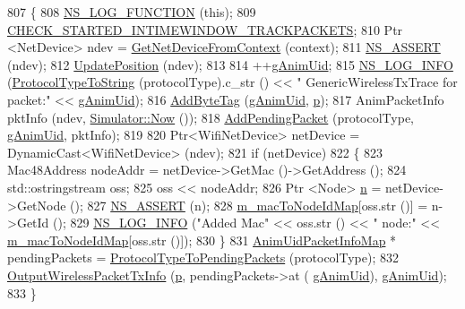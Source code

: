 \begin{DoxyCode}
807 \{
808   \hyperlink{log-macros-disabled_8h_a90b90d5bad1f39cb1b64923ea94c0761}{NS\_LOG\_FUNCTION} (\textcolor{keyword}{this});
809   \hyperlink{animation-interface_8h_acdf351a3155a6ccf1813189e10dba8f5}{CHECK\_STARTED\_INTIMEWINDOW\_TRACKPACKETS};
810   Ptr <NetDevice> ndev = \hyperlink{classns3_1_1AnimationInterface_a5054e94f0c5e3d0a4443cfbe52e2ea30}{GetNetDeviceFromContext} (context);
811   \hyperlink{assert_8h_a6dccdb0de9b252f60088ce281c49d052}{NS\_ASSERT} (ndev);
812   \hyperlink{classns3_1_1AnimationInterface_ab751cf6f459289f0978f4bb97b93044d}{UpdatePosition} (ndev);
813 
814   ++\hyperlink{classns3_1_1AnimationInterface_a98ecb4d4c024e52171b3154f09b7bcc2}{gAnimUid};
815   \hyperlink{group__logging_gafbd73ee2cf9f26b319f49086d8e860fb}{NS\_LOG\_INFO} (\hyperlink{classns3_1_1AnimationInterface_a1b901b34acadaa3c35433083d542dd19}{ProtocolTypeToString} (protocolType).c\_str () << \textcolor{stringliteral}{"
       GenericWirelessTxTrace for packet:"} << \hyperlink{classns3_1_1AnimationInterface_a98ecb4d4c024e52171b3154f09b7bcc2}{gAnimUid});
816   \hyperlink{classns3_1_1AnimationInterface_a7963c89df19cb9a145f16a369e83ec9c}{AddByteTag} (\hyperlink{classns3_1_1AnimationInterface_a98ecb4d4c024e52171b3154f09b7bcc2}{gAnimUid}, \hyperlink{lte__link__budget_8m_ac9de518908a968428863f829398a4e62}{p});
817   AnimPacketInfo pktInfo (ndev, \hyperlink{classns3_1_1Simulator_ac3178fa975b419f7875e7105be122800}{Simulator::Now} ());
818   \hyperlink{classns3_1_1AnimationInterface_ab7f3bc1843610f2d9514ddf5d756eaa5}{AddPendingPacket} (protocolType, \hyperlink{classns3_1_1AnimationInterface_a98ecb4d4c024e52171b3154f09b7bcc2}{gAnimUid}, pktInfo);
819 
820   Ptr<WifiNetDevice> netDevice = DynamicCast<WifiNetDevice> (ndev);
821   \textcolor{keywordflow}{if} (netDevice)
822     \{ 
823       Mac48Address nodeAddr = netDevice->GetMac ()->GetAddress ();
824       std::ostringstream oss; 
825       oss << nodeAddr;
826       Ptr <Node> \hyperlink{namespacesample-rng-plot_aeb5ee5c431e338ef39b7ac5431242e1d}{n} = netDevice->GetNode ();
827       \hyperlink{assert_8h_a6dccdb0de9b252f60088ce281c49d052}{NS\_ASSERT} (n);
828       \hyperlink{classns3_1_1AnimationInterface_a4d47d5b16cac7965cc0fbb1c50b3a268}{m\_macToNodeIdMap}[oss.str ()] = n->GetId ();
829       \hyperlink{group__logging_gafbd73ee2cf9f26b319f49086d8e860fb}{NS\_LOG\_INFO} (\textcolor{stringliteral}{"Added Mac"} << oss.str () << \textcolor{stringliteral}{" node:"} <<
      \hyperlink{classns3_1_1AnimationInterface_a4d47d5b16cac7965cc0fbb1c50b3a268}{m\_macToNodeIdMap}[oss.str ()]);
830     \}
831   \hyperlink{classns3_1_1AnimationInterface_afea577896009c4134df836bc20f1eabe}{AnimUidPacketInfoMap} * pendingPackets =  
      \hyperlink{classns3_1_1AnimationInterface_a3785f870e7f29eb0ea0b843327fad5bb}{ProtocolTypeToPendingPackets} (protocolType); 
832   \hyperlink{classns3_1_1AnimationInterface_a473fae6007101c1b553231084eff90b3}{OutputWirelessPacketTxInfo} (\hyperlink{lte__link__budget_8m_ac9de518908a968428863f829398a4e62}{p}, pendingPackets->at (
      \hyperlink{classns3_1_1AnimationInterface_a98ecb4d4c024e52171b3154f09b7bcc2}{gAnimUid}), \hyperlink{classns3_1_1AnimationInterface_a98ecb4d4c024e52171b3154f09b7bcc2}{gAnimUid});
833 \}
\end{DoxyCode}


